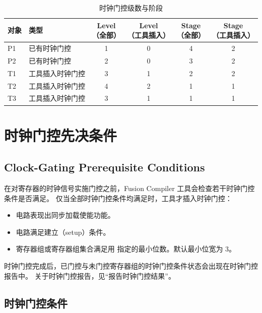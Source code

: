 \begin{table}[htbp]
\centering
\caption{时钟门控级数与阶段}
\label{tab:cg-levels-stages}
\small
\begin{tabularx}{\textwidth}{@{}l >{\raggedright\arraybackslash}X cccc@{}}
\toprule
\textbf{对象} & \textbf{类型}
 & \makecell{\textbf{Level}\\（全部）}
 & \makecell{\textbf{Level}\\（工具插入）}
 & \makecell{\textbf{Stage}\\（全部）}
 & \makecell{\textbf{Stage}\\（工具插入）} \\
\midrule
P1 & 已有时钟门控 & 1 & 0 & 4 & 2 \\
P2 & 已有时钟门控 & 2 & 0 & 3 & 2 \\
T1 & 工具插入时钟门控 & 3 & 1 & 2 & 2 \\
T2 & 工具插入时钟门控 & 4 & 2 & 1 & 1 \\
T3 & 工具插入时钟门控 & 3 & 1 & 1 & 1 \\
\bottomrule
\end{tabularx}
\end{table}

\section{时钟门控先决条件}
\subsection*{Clock-Gating Prerequisite Conditions}

在对寄存器的时钟信号实施门控之前，Fusion Compiler 工具会检查若干时钟门控条件是否满足。
仅当全部时钟门控条件均满足时，工具才插入时钟门控：
\begin{itemize}
  \item 电路表现出同步加载使能功能。
  \item 电路满足建立（setup）条件。
  \item 寄存器组或寄存器组集合满足用  指定的最小位数。默认最小位宽为 3。
\end{itemize}

时钟门控完成后，已门控与未门控寄存器组的时钟门控条件状态会出现在时钟门控报告中。
关于时钟门控报告，见“报告时钟门控结果”。

\subsection{时钟门控条件}
